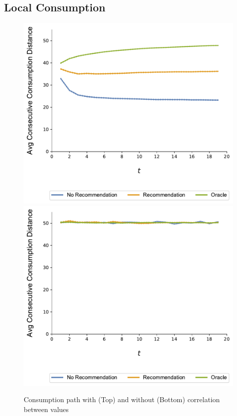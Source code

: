 \documentclass[sigconf, anonymous, review]{acmart}
\begin{document}
\subsection{Local Consumption}
\begin{figure}
\includegraphics[width=.9\linewidth]{figures/rho_pos_consumption_dist_N_200T_20_overall.pdf}\\
\includegraphics[width=.9\linewidth]{figures/rho_zero_consumption_dist_N_200T_20_overall.pdf}\\
\caption{Consumption path with (Top) and without (Bottom) correlation between values}
\label{fig:correlation_consumption_path}
\end{figure}
\end{document}
